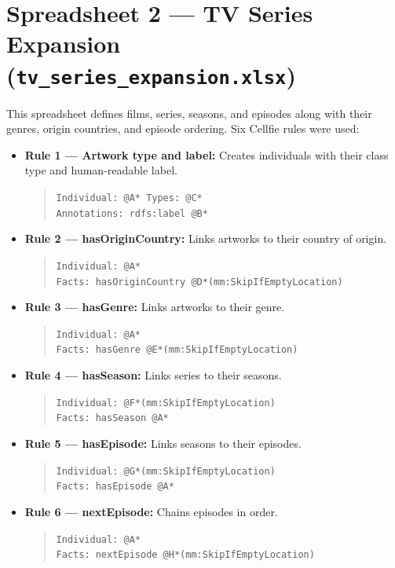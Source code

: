 \vspace{0.5cm}
\section*{Spreadsheet 2 — TV Series Expansion (\texttt{tv\_series\_expansion.xlsx})}

This spreadsheet defines films, series, seasons, and episodes along with their genres, origin countries, and episode ordering. Six Cellfie rules were used:

\begin{itemize}
    \item \textbf{Rule 1 — Artwork type and label:} Creates individuals with their class type and human-readable label.
    \begin{quote}\small
    \texttt{Individual: @A* \quad Types: @C*}\\
    \texttt{Annotations: rdfs:label @B*}
    \end{quote}

    \item \textbf{Rule 2 — hasOriginCountry:} Links artworks to their country of origin.
    \begin{quote}\small
    \texttt{Individual: @A*}\\
    \texttt{Facts: hasOriginCountry @D*(mm:SkipIfEmptyLocation)}
    \end{quote}

    \item \textbf{Rule 3 — hasGenre:} Links artworks to their genre.
    \begin{quote}\small
    \texttt{Individual: @A*}\\
    \texttt{Facts: hasGenre @E*(mm:SkipIfEmptyLocation)}
    \end{quote}

    \item \textbf{Rule 4 — hasSeason:} Links series to their seasons.
    \begin{quote}\small
    \texttt{Individual: @F*(mm:SkipIfEmptyLocation)}\\
    \texttt{Facts: hasSeason @A*}
    \end{quote}

    \item \textbf{Rule 5 — hasEpisode:} Links seasons to their episodes.
    \begin{quote}\small
    \texttt{Individual: @G*(mm:SkipIfEmptyLocation)}\\
    \texttt{Facts: hasEpisode @A*}
    \end{quote}

    \item \textbf{Rule 6 — nextEpisode:} Chains episodes in order.
    \begin{quote}\small
    \texttt{Individual: @A*}\\
    \texttt{Facts: nextEpisode @H*(mm:SkipIfEmptyLocation)}
    \end{quote}
\end{itemize}

